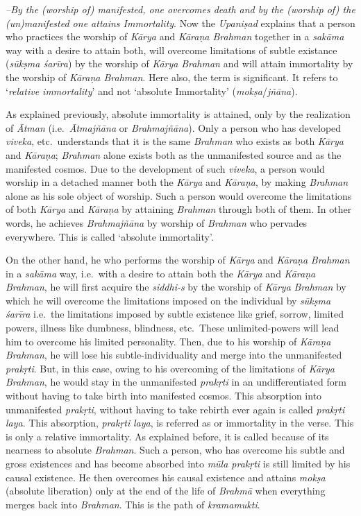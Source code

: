  \emph{--By the (worship of) manifested, one overcomes death and by the (worship of) the (un)manifested one attains Immortality}. Now the \emph{Upaniṣad} explains that a person who practices the worship of \emph{Kārya} and \emph{Kāraṇa Brahman} together in a \emph{sakāma} way with a desire to attain both, will overcome limitations of subtle existance (\emph{sūkṣma śarīra}) by the worship of \emph{Kārya} \emph{Brahman} and will attain immortality by the worship of \emph{Kāraṇa Brahman}. Here also, the term  is significant. It refers to `\emph{relative immortality}' and not `absolute Immortality' (\emph{mokṣa}/\emph{jñāna}).

As explained previously, absolute immortality is attained, only by the realization of \emph{Ātman} (i.e.\ \emph{Ātmajñāna} or \emph{Brahmajñāna}). Only a person who has developed \emph{viveka}, etc.\ understands that it is the same \emph{Brahman} who exists as both \emph{Kārya} and \emph{Kāraṇa}; \emph{Brahman} alone exists both as the unmanifested source and as the manifested cosmos. Due to the development of such \emph{viveka}, a person would worship in a detached manner both the \emph{Kārya} and \emph{Kāraṇa}, by making \emph{Brahman} alone as his sole object of worship. Such a person would overcome the limitations of both \emph{Kārya} and \emph{Kāraṇa} by attaining \emph{Brahman} through both of them. In other words, he achieves \emph{Brahmajñāna} by worship of \emph{Brahman} who pervades everywhere. This is called `absolute immortality'.

On the other hand, he who performs the worship of \emph{Kārya} and \emph{Kāraṇa} \emph{Brahman} in a \emph{sakāma} way, i.e.\ with a desire to attain both the \emph{Kārya} and \emph{Kāraṇa} \emph{Brahman}, he will first acquire the \emph{siddhi-s} by the worship of \emph{Kārya} \emph{Brahman} by which he will overcome the limitations imposed on the individual by \emph{sūkṣma śarīra} i.e.\ the limitations imposed by subtle existence like grief, sorrow, limited powers, illness like dumbness, blindness, etc.\ These unlimited-powers will lead him to overcome his limited personality. Then, due to his worship of \emph{Kāraṇa Brahman}, he will lose his subtle-individuality and merge into the unmanifested \emph{prakṛti}. But, in this case, owing to his overcoming of the limitations of \emph{Kārya} \emph{Brahman}, he would stay in the unmanifested \emph{prakṛti} in an undifferentiated form without having to take birth into manifested cosmos. This absorption into unmanifested \emph{prakṛti}, without having to take rebirth ever again is called \emph{prakṛti} \emph{laya}. This absorption, \emph{prakṛti} \emph{laya}, is referred as  or immortality in the verse. This is only a relative immortality. As explained before, it is called  because of its nearness to absolute \emph{Brahman}. Such a person, who has overcome his subtle and gross existences and has become absorbed into \emph{mūla prakṛti} is still limited by his causal existence. He then overcomes his causal existence and attains \emph{mokṣa} (absolute liberation) only at the end of the life of \emph{Brahmā} when everything merges back into \emph{Brahman}. This is the path of \emph{kramamukti}.

